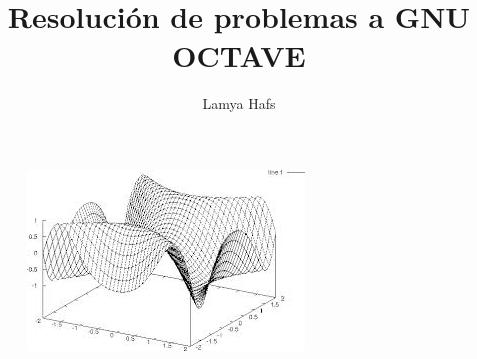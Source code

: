 \documentclass[a4,12pt]{article}
\title{Resolución de problemas a GNU OCTAVE}
\author{Lamya Hafs}
\begin{document}
\maketitle
\bigskip
\bigskip
\bigskip
\begin{figure}[H]
  \centering
    \includegraphics{imagenes/octave}
\end{figure}
\newpage

\maketitle
\end{document}
